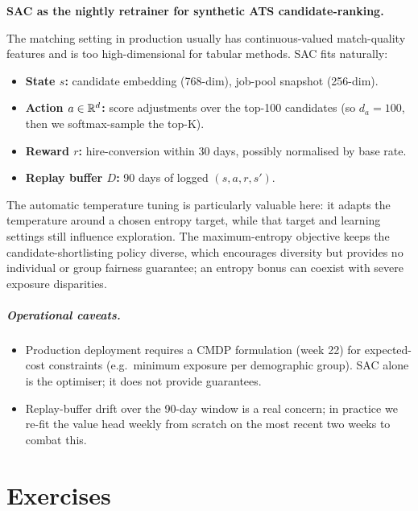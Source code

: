 \documentclass[11pt,oneside]{scrbook}
\begin{document}
\begin{matching}
\textbf{SAC as the nightly retrainer for synthetic ATS candidate-ranking.}

The matching setting in production usually has continuous-valued match-quality features and is too high-dimensional for tabular methods. SAC fits naturally:
\begin{itemize}
  \item \textbf{State $s$:} candidate embedding (768-dim), job-pool snapshot (256-dim).
  \item \textbf{Action $a \in \mathbb{R}^d$:} score adjustments over the top-100 candidates (so $d_a=100$, then we softmax-sample the top-K).
  \item \textbf{Reward $r$:} hire-conversion within 30 days, possibly normalised by base rate.
  \item \textbf{Replay buffer $D$:} 90 days of logged $(s, a, r, s')$.
\end{itemize}

The automatic temperature tuning is particularly valuable here: it adapts the temperature around a chosen entropy target, while that target
and learning settings still influence exploration. The maximum-entropy objective keeps the candidate-shortlisting policy diverse, which encourages diversity but provides no individual or group fairness guarantee; an entropy bonus can coexist with severe exposure disparities.

\paragraph{Operational caveats.}
\begin{itemize}
  \item Production deployment requires a CMDP formulation (week 22) for expected-cost constraints (e.g.\ minimum exposure per demographic group). SAC alone is the optimiser; it does not provide guarantees.
  \item Replay-buffer drift over the 90-day window is a real concern; in practice we re-fit the value head weekly from scratch on the most recent two weeks to combat this.
\end{itemize}
\end{matching}

\chapter{Exercises}
\end{document}
